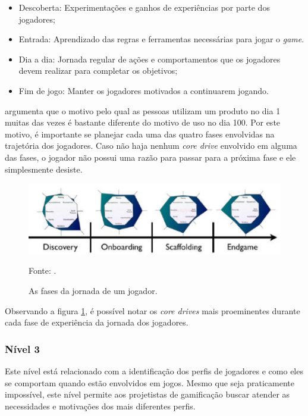\begin{itemize}
	\item Descoberta: Experimentações e ganhos de experiências por parte dos jogadores;
	\item Entrada: Aprendizado das regras e ferramentas necessárias para jogar o \textit{game}.
	\item Dia a dia: Jornada regular de ações e comportamentos que os jogadores devem realizar para completar os objetivos;
	\item Fim de jogo: Manter os jogadores motivados a continuarem jogando.
	
\end{itemize}

 argumenta que o motivo pelo qual as pessoas utilizam um produto no dia 1 muitas das vezes é bastante diferente do
motivo de uso no dia 100. Por este motivo, é importante se planejar cada uma das quatro fases envolvidas na trajetória dos jogadores. Caso não haja nenhum
\textit{core drive} envolvido em alguma das fases, o jogador não possui uma razão para passar para a próxima fase e ele simplesmente desiste.

\begin{figure}[h]
	\centering
	\includegraphics[keepaspectratio=true,scale=0.48]{figuras/fasesjornada.png}
	\caption{As fases da jornada de um jogador.}
	Fonte: \cite{chou2017actionable}.
	\label{fasesjornada}
\end{figure}

Observando a figura \ref{fasesjornada}, é possível notar os \textit{core drives} mais proeminentes durante cada fase de experiência da jornada
dos jogadores.

\subsubsection{Nível 3}
Este nível está relacionado com a identificação dos perfis de jogadores e como eles se comportam quando estão envolvidos em jogos. Mesmo que seja
praticamente impossível, este nível permite aos projetistas de gamificação buscar atender as necessidades e motivações dos mais diferentes perfis.

